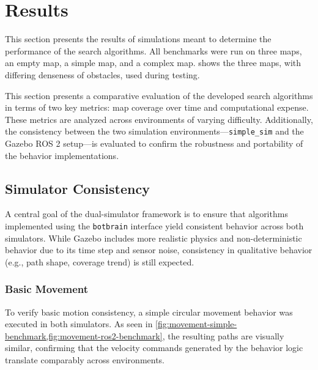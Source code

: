 \section{Results}
\label{sec:results}
This section presents the results of simulations meant to determine the performance of the search algorithms. All benchmarks were run on three maps, an empty map, a simple map, and a complex map.  shows the three maps, with differing denseness of obstacles, used during testing.

This section presents a comparative evaluation of the developed search algorithms in terms of two key metrics: map coverage over time and computational expense. These metrics are analyzed across environments of varying difficulty. 
Additionally, the consistency between the two simulation environments—\texttt{simple\_sim} and the Gazebo ROS 2 setup—is evaluated to confirm the robustness and portability of the behavior implementations.


\subsection{Simulator Consistency}
A central goal of the dual-simulator framework is to ensure that algorithms implemented using the \texttt{botbrain} interface yield consistent behavior across both simulators. While Gazebo includes more realistic physics and non-deterministic behavior due to its time step and sensor noise, consistency in qualitative behavior (e.g., path shape, coverage trend) is still expected.


\subsubsection{Basic Movement}
To verify basic motion consistency, a simple circular movement behavior was executed in both simulators. As seen in \cref{fig:movement-simple-benchmark,fig:movement-ros2-benchmark}, the resulting paths are visually similar, confirming that the velocity commands generated by the behavior logic translate comparably across environments.


